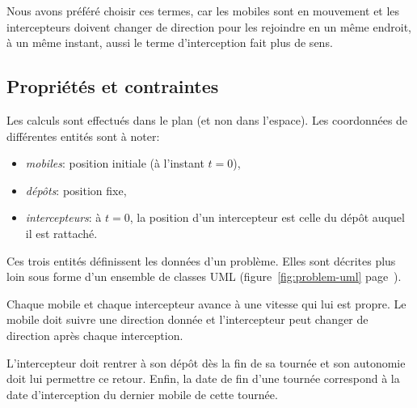 			Nous avons préféré choisir ces termes, car les mobiles sont en mouvement et les intercepteurs doivent changer de direction pour les rejoindre en un même endroit, à un même instant, aussi le terme d'interception fait plus de sens.

		\subsection{Propriétés et contraintes}
			Les calculs sont effectués dans le plan (et non dans l'espace). Les coordonnées de différentes entités sont à noter:
			\begin{itemize}
				\item \emph{mobiles}: position initiale (à l'instant $t=0$),
				\item \emph{dépôts}: position fixe,
				\item \emph{intercepteurs}: à $t=0$, la position d'un intercepteur est celle du dépôt auquel il est rattaché.
			\end{itemize}

			Ces trois entités définissent les données d'un problème. Elles sont décrites plus loin sous forme d'un ensemble de classes UML (figure~\ref{fig:problem-uml} page~\pageref{fig:problem-uml}).

			Chaque mobile et chaque intercepteur avance à une vitesse qui lui est propre. Le mobile doit suivre une direction donnée et l'intercepteur peut changer de direction après chaque interception.

			L'intercepteur doit rentrer à son dépôt dès la fin de sa tournée et son autonomie doit lui permettre ce retour. Enfin, la date de fin d'une tournée correspond à la date d'interception du dernier mobile de cette tournée.

